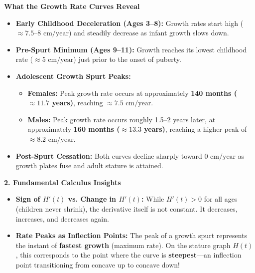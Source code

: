 \documentclass[10.5pt]{article}
\begin{document}
\begin{tcolorbox}[colback=boxbg, colframe=boxframe, boxrule=0.8pt, arc=3pt, left=8pt, right=8pt, top=4pt, bottom=4pt]
\textbf{\large What the Growth Rate Curves Reveal}
\begin{itemize}[leftmargin=1.2em, topsep=2pt, itemsep=4pt]
  \item \textbf{Early Childhood Deceleration (Ages 3--8):} Growth rates start high ($\approx 7.5\text{--}8\text{ cm/year}$) and steadily decrease as infant growth slows down.
  \item \textbf{Pre-Spurt Minimum (Ages 9--11):} Growth reaches its lowest childhood rate ($\approx 5\text{ cm/year}$) just prior to the onset of puberty.
  \item \textbf{Adolescent Growth Spurt Peaks:}
  \begin{itemize}[label=--]
    \item \textbf{Females:} Peak growth rate occurs at approximately \textbf{140 months ($\approx 11.7$ years)}, reaching $\approx 7.5\text{ cm/year}$.
    \item \textbf{Males:} Peak growth rate occurs roughly 1.5--2 years later, at approximately \textbf{160 months ($\approx 13.3$ years)}, reaching a higher peak of $\approx 8.2\text{ cm/year}$.
  \end{itemize}
  \item \textbf{Post-Spurt Cessation:} Both curves decline sharply toward $0\text{ cm/year}$ as growth plates fuse and adult stature is attained.
\end{itemize}
\end{tcolorbox}

\vspace{0.04in}

\textbf{\large 2. Fundamental Calculus Insights}

\begin{tcolorbox}[colback=chalkblue!6, colframe=chalkblue, boxrule=1pt, arc=3pt, left=8pt, right=8pt, top=4pt, bottom=4pt]
\begin{itemize}[leftmargin=1.2em, topsep=1pt, itemsep=3pt]
  \item \textbf{Sign of $H'(t)$ vs. Change in $H'(t)$:}
    While $H'(t) > 0$ for all ages (children never shrink), the derivative itself is not constant. It decreases, increases, and decreases again.
  \item \textbf{Rate Peaks as Inflection Points:}
    The peak of a growth spurt represents the instant of \textbf{fastest growth} (maximum rate). On the stature graph $H(t)$, this corresponds to the point where the curve is \textbf{steepest}---an inflection point transitioning from concave up to concave down!
\end{itemize}
\end{tcolorbox}
\end{document}

